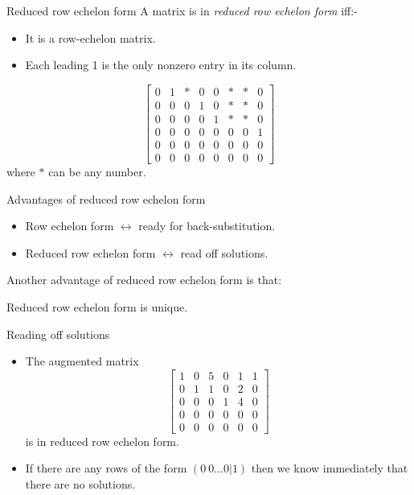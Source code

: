 \documentclass{beamer}
\begin{document}
\begin{frame}{Reduced row echelon form}
  A matrix is in \emph{reduced row echelon form} iff:-
  \begin{itemize}
  \item It is a row-echelon matrix.
  \item Each leading 1 is the only nonzero entry in its
    column.
  \end{itemize}
  \begin{equation*}
      \left[\begin{array}{rrrrrrrr}
              0 & 1 & * & 0 & 0 & * & * & 0 \\
              0 & 0 & 0 & 1 & 0 & * & * & 0 \\
              0 & 0 & 0 & 0 & 1 & * & * & 0 \\
              0 & 0 & 0 & 0 & 0 & 0 & 0 & 1 \\
              0 & 0 & 0 & 0 & 0 & 0 & 0 & 0 \\
              0 & 0 & 0 & 0 & 0 & 0 & 0 & 0 
            \end{array}\right] 
        \end{equation*}
        where $*$ can be any number.
\end{frame}

\begin{frame}{Advantages of reduced row echelon form}
  \begin{itemize}
  \item Row echelon form $\leftrightarrow$ ready for back-substitution.\vfill
  \item Reduced row echelon form $\leftrightarrow$ read off solutions.
  \end{itemize}\vfill
  Another advantage of reduced row echelon form is that:\vfill
  \begin{theorem}
    Reduced row echelon form is unique.
  \end{theorem}
\end{frame}

\begin{frame}{Reading off solutions}
  \begin{itemize}
  \item   The augmented matrix
    \begin{equation*}
      \left[\begin{array}{rrrrr|r}
               1 & 0 & 5 & 0 & 1 &1 \\
               0 & 1 & 1 & 0 & 2 &0 \\
               0 & 0 & 0 & 1 & 4 &0 \\
               0 & 0 & 0 & 0 & 0 &0\\
               0 & 0 & 0 & 0 & 0 &0
            \end{array}\right] 
        \end{equation*}
        is in reduced row echelon form.\vfill
      \item If there are any rows of the form $(0~ 0...0|1)$ then we know immediately that there are no solutions.
  \end{itemize}
\end{frame}
\end{document}
